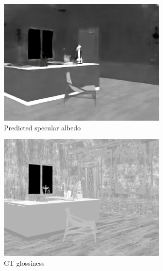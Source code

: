 \begin{figure}
\begin{subfigure}{0.32\linewidth}
    \includegraphics[width=\linewidth]{praca/images/AI43_004_Cam02.specular_output.png}
    \caption{Predicted specular albedo}
  \end{subfigure}
  \begin{subfigure}{0.32\linewidth}
    \includegraphics[width=\linewidth]{praca/images/AI43_004_Cam02.glossiness.png}
    \caption{GT glossiness}
  \end{subfigure}
  \begin{subfigure}{0.32\linewidth}

\end{subfigure}
\end{figure}
